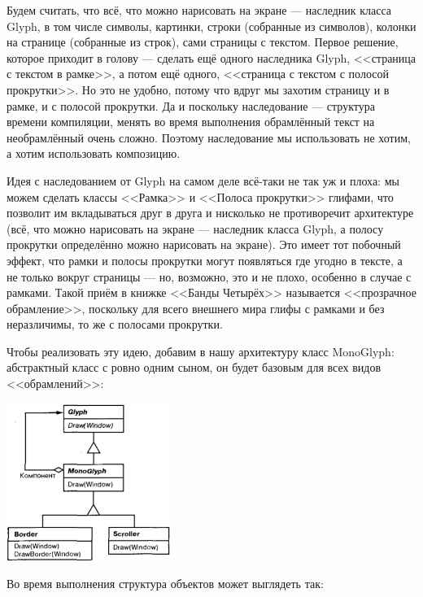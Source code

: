 \documentclass{../../text-style}
\begin{document}
Будем считать, что всё, что можно нарисовать на экране --- наследник класса Glyph, в том числе символы, картинки, строки (собранные из символов), колонки на странице (собранные из строк), сами страницы с текстом. Первое решение, которое приходит в голову --- сделать ещё одного наследника Glyph, <<страница с текстом в рамке>>, а потом ещё одного, <<страница с текстом с полосой прокрутки>>. Но это не удобно, потому что вдруг мы захотим страницу и в рамке, и с полосой прокрутки. Да и поскольку наследование --- структура времени компиляции, менять во время выполнения обрамлённый текст на необрамлённый очень сложно. Поэтому наследование мы использовать не хотим, а хотим использовать композицию. 

Идея с наследованием от Glyph на самом деле всё-таки не так уж и плоха: мы можем сделать классы <<Рамка>> и <<Полоса прокрутки>> глифами, что позволит им вкладываться друг в друга и нисколько не противоречит архитектуре (всё, что можно нарисовать на экране --- наследник класса Glyph, а полосу прокрутки определённо можно нарисовать на экране). Это имеет тот побочный эффект, что рамки и полосы прокрутки могут появляться где угодно в тексте, а не только вокруг страницы --- но, возможно, это и не плохо, особенно в случае с рамками. Такой приём в книжке <<Банды Четырёх>> называется <<прозрачное обрамление>>, поскольку для всего внешнего мира глифы с рамками и без неразличимы, то же с полосами прокрутки.

Чтобы реализовать эту идею, добавим в нашу архитектуру класс MonoGlyph: абстрактный класс с ровно одним сыном, он будет базовым для всех видов <<обрамлений>>:

\begin{center}
    \includegraphics[width=0.4\textwidth]{monoglyph.png}
\end{center}

Во время выполнения структура объектов может выглядеть так:
\end{document}
